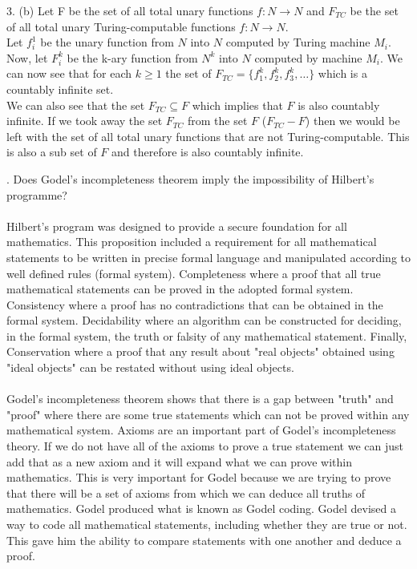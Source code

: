 \documentclass[a4paper,12pt]{article}
\begin{document}
3. (b) Let F be the set of all total unary functions $f: N \to N $ and $F_{TC}$ be the set of all total unary Turing-computable functions $f: N \to N$.\\
Let $f^1_i$ be the unary function from $N$ into $N$ computed by Turing machine $M_i$. Now, let $F^k_i$ be the k-ary function from $N^k$ into $N$ computed by machine $M_i$.
We can now see that for each $k \geq 1$ the set of $F_{TC} = \{ f^k_1, f^k_2, f^k_3, \dots \}$ which is a countably infinite set.  \\
We can also see that the set $F_{TC} \subseteq F$ which implies that $F$ is also countably infinite. If we took away the set $F_{TC}$ from the set $F$ ($F_{TC}-F$) then we would be left with the set of all total unary functions that are not Turing-computable. This is also a sub set of $F$ and therefore is also countably infinite.


. Does Godel's incompleteness theorem imply the impossibility of Hilbert's programme? \\
\\
Hilbert's program was designed to provide a secure foundation for all mathematics. This proposition included a requirement for all mathematical statements to be written in precise formal language and manipulated according to well defined rules (formal system). Completeness where a proof that all true mathematical statements can be proved in the adopted formal system. Consistency where a proof has no contradictions that can be obtained in the formal system. Decidability where an algorithm can be constructed for deciding, in the formal system, the truth or falsity of any mathematical statement. Finally, Conservation where a proof that any result about "real objects" obtained using "ideal objects" can be restated without using ideal objects. \\ \\
Godel's incompleteness theorem shows that there is a gap between "truth" and "proof" where there are some true statements which can not be proved within any mathematical system. Axioms are an important part of Godel's incompleteness theory. If we do not have all of the axioms to prove a true statement we can just add that as a new axiom and it will expand what we can prove within mathematics. This is very important for Godel because we are trying to prove that there will be a set of axioms from which we can deduce all truths of mathematics. Godel produced what is known as Godel coding. Godel devised a way to code all mathematical statements, including whether they are true or not. This gave him the ability to compare statements with one another and deduce a proof. \\
\end{document}
